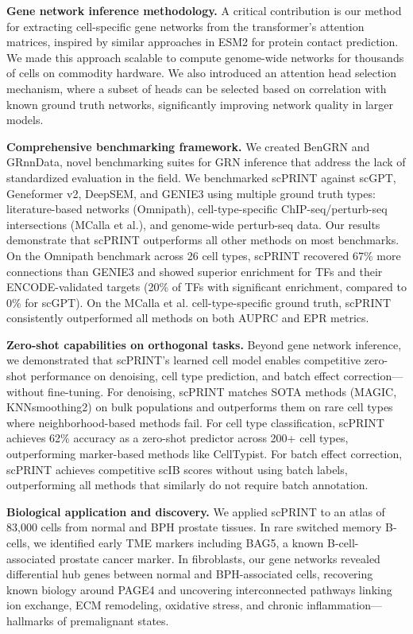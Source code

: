 \textbf{Gene network inference methodology.} A critical contribution is our method for extracting cell-specific gene networks from the transformer's attention matrices, inspired by similar approaches in \gls{ESM}2 for protein contact prediction. We made this approach scalable to compute genome-wide networks for thousands of cells on commodity hardware. We also introduced an attention head selection mechanism, where a subset of heads can be selected based on correlation with known ground truth networks, significantly improving network quality in larger models.

\textbf{Comprehensive benchmarking framework.} We created BenGRN and GRnnData, novel benchmarking suites for \gls{GRN} inference that address the lack of standardized evaluation in the field. We benchmarked \gls{scPRINT} against \gls{scGPT}, Geneformer v2, Deep\gls{SEM}, and GENIE3 using multiple ground truth types: literature-based networks (Omnipath), cell-type-specific \gls{ChIP-seq}/perturb-seq intersections (MCalla et al.), and genome-wide perturb-seq data. Our results demonstrate that \gls{scPRINT} outperforms all other methods on most benchmarks. On the Omnipath benchmark across 26 cell types, \gls{scPRINT} recovered 67\% more connections than GENIE3 and showed superior enrichment for \gls{TF}s and their \gls{ENCODE}-validated targets (20\% of \gls{TF}s with significant enrichment, compared to 0\% for \gls{scGPT}). On the MCalla et al. cell-type-specific ground truth, \gls{scPRINT} consistently outperformed all methods on both \gls{AUPRC} and \gls{EPR} metrics.

\textbf{Zero-shot capabilities on orthogonal tasks.} Beyond gene network inference, we demonstrated that \gls{scPRINT}'s learned cell model enables competitive zero-shot performance on denoising, cell type prediction, and batch effect correction---without fine-tuning. For denoising, \gls{scPRINT} matches \gls{SOTA} methods (MAGIC, KNNsmoothing2) on bulk populations and outperforms them on rare cell types where neighborhood-based methods fail. For cell type classification, \gls{scPRINT} achieves 62\% accuracy as a zero-shot predictor across 200+ cell types, outperforming marker-based methods like CellTypist. For batch effect correction, \gls{scPRINT} achieves competitive \gls{scIB} scores without using batch labels, outperforming all methods that similarly do not require batch annotation.

\textbf{Biological application and discovery.} We applied \gls{scPRINT} to an atlas of 83,000 cells from normal and \gls{BPH} prostate tissues. In rare switched memory B-cells, we identified early \gls{TME} markers including BAG5, a known B-cell-associated prostate cancer marker. In fibroblasts, our gene networks revealed differential hub genes between normal and \gls{BPH}-associated cells, recovering known biology around PAGE4 and uncovering interconnected pathways linking ion exchange, \gls{ECM} remodeling, oxidative stress, and chronic inflammation---hallmarks of premalignant states.


